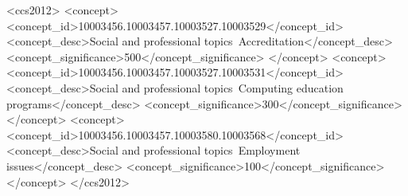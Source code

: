 \documentclass[sigconf]{acmart}
\begin{document}
%
%
 \begin{CCSXML}
	<ccs2012>
	<concept>
	<concept_id>10003456.10003457.10003527.10003529</concept_id>
	<concept_desc>Social and professional topics~Accreditation</concept_desc>
	<concept_significance>500</concept_significance>
	</concept>
	<concept>
	<concept_id>10003456.10003457.10003527.10003531</concept_id>
	<concept_desc>Social and professional topics~Computing education programs</concept_desc>
	<concept_significance>300</concept_significance>
	</concept>
	<concept>
	<concept_id>10003456.10003457.10003580.10003568</concept_id>
	<concept_desc>Social and professional topics~Employment issues</concept_desc>
	<concept_significance>100</concept_significance>
	</concept>
	</ccs2012>
\end{CCSXML}


%

%
\maketitle
\end{document}
